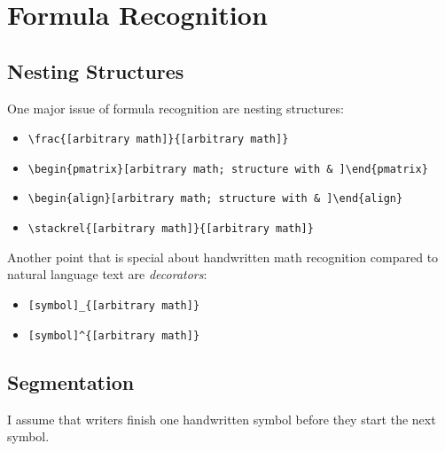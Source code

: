 \chapter{Formula Recognition}\label{ch:FormulaRecognition}
\section{Nesting Structures}
One major issue of formula recognition are nesting structures:

\begin{itemize}
    \item \verb+\frac{[arbitrary math]}{[arbitrary math]}+
    \item \verb+\begin{pmatrix}[arbitrary math; structure with & ]\end{pmatrix}+
    \item \verb+\begin{align}[arbitrary math; structure with & ]\end{align}+
    \item \verb+\stackrel{[arbitrary math]}{[arbitrary math]}+
\end{itemize}

Another point that is special about handwritten math recognition compared to
natural language text are \textit{decorators}:

\begin{itemize}
    \item \verb+[symbol]_{[arbitrary math]}+
    \item \verb+[symbol]^{[arbitrary math]}+
\end{itemize}

\section{Segmentation}
I assume that writers finish one handwritten symbol before they start the next
symbol.